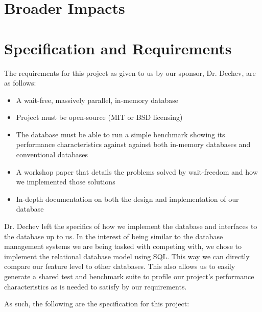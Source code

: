 \documentclass[letterpaper, 12pt]{article}
\begin{document}
\section{Broader Impacts}
\newpage

\section{Specification and Requirements}
The requirements for this project as given to us by our sponsor, Dr. Dechev, are as follows:
\begin{itemize}
 \item A wait-free, massively parallel, in-memory database
 \item Project must be open-source (MIT or BSD licensing)
 \item The database must be able to run a simple benchmark showing its performance characteristics against
 against both in-memory databases and conventional databases
 \item A workshop paper that details the problems solved by wait-freedom and how we
 implemented those solutions
 \item In-depth documentation on both the design and implementation of our database
\end{itemize}
\par\vspace{\baselineskip}
Dr. Dechev left the specifics of how we implement the database and interfaces to the database
up to us. In the interest of being similar to the database management systems we are being
tasked with competing with, we chose to implement the relational database model using SQL. This way we
can directly compare our feature level to other databases. This also allows us to easily generate
a shared test and benchmark suite to profile our project's performance characteristics as is needed
to satisfy by our requirements.
\par\vspace{\baselineskip}
As such, the following are the specification for this project:
\end{document}
